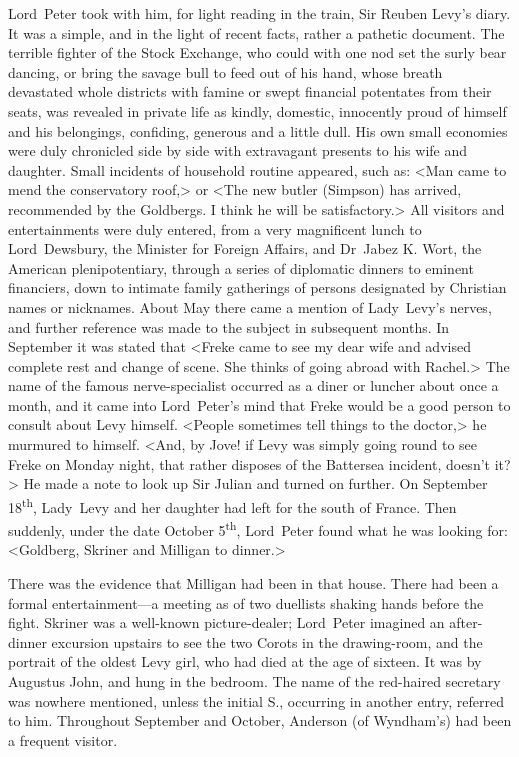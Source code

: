 Lord~Peter took with him, for light reading in the train, Sir Reuben Levy's diary. It was a simple, and in the light of recent facts, rather a pathetic document. The terrible fighter of the Stock Exchange, who could with one nod set the surly bear dancing, or bring the savage bull to feed out of his hand, whose breath devastated whole districts with famine or swept financial potentates from their seats, was revealed in private life as kindly, domestic, innocently proud of himself and his belongings, confiding, generous and a little dull. His own small economies were duly chronicled side by side with extravagant presents to his wife and daughter. Small incidents of household routine appeared, such as: <Man came to mend the conservatory roof,> or <The new butler (Simpson) has arrived, recommended by the Goldbergs. I think he will be satisfactory.> All visitors and entertainments were duly entered, from a very magnificent lunch to Lord~Dewsbury, the Minister for Foreign Affairs, and Dr~Jabez K\@. Wort, the American plenipotentiary, through a series of diplomatic dinners to eminent financiers, down to intimate family gatherings of persons designated by Christian names or nicknames. About May there came a mention of Lady~Levy's nerves, and further reference was made to the subject in subsequent months. In September it was stated that <Freke came to see my dear wife and advised complete rest and change of scene. She thinks of going abroad with Rachel.> The name of the famous nerve-specialist occurred as a diner or luncher about once a month, and it came into Lord~Peter's mind that Freke would be a good person to consult about Levy himself. <People sometimes tell things to the doctor,> he murmured to himself. <And, by Jove! if Levy was simply going round to see Freke on Monday night, that rather disposes of the Battersea incident, doesn't it?> He made a note to look up Sir Julian and turned on further. On September 18\textsuperscript{th}, Lady~Levy and her daughter had left for the south of France. Then suddenly, under the date October 5\textsuperscript{th}, Lord~Peter found what he was looking for: <Goldberg, Skriner and Milligan to dinner.>

There was the evidence that Milligan had been in that house. There had been a formal entertainment—a meeting as of two duellists shaking hands before the fight. Skriner was a well-known picture-dealer; Lord~Peter imagined an after-dinner excursion upstairs to see the two Corots in the drawing-room, and the portrait of the oldest Levy girl, who had died at the age of sixteen. It was by Augustus John, and hung in the bedroom. The name of the red-haired secretary was nowhere mentioned, unless the initial S\@., occurring in another entry, referred to him. Throughout September and October, Anderson (of Wyndham's) had been a frequent visitor.

